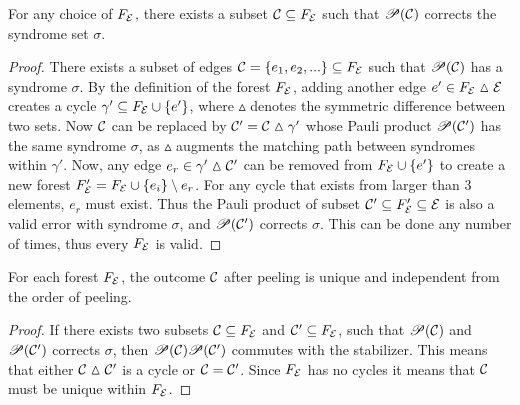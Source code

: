 \begin{lemma}\label{lem:anyforest}
  For any choice of $F_{\mathcal{E}}$, there exists a subset $\mathcal{C}\subseteq F_{\mathcal{E}}$ such that $\mathscr{P}(\mathcal{C})$ corrects the syndrome set $\sigma$.
\end{lemma}
\begin{proof}
  There exists a subset of edges $\mathcal{C} = \{e_1,e_2,...\} \subseteq F_{\mathcal{E}}$ such that $\mathscr{P}(\mathcal{C})$ has a syndrome $\sigma$. By the definition of the forest $F_{\mathcal{E}}$, adding another edge $e' \in F_{\mathcal{E}} \vartriangle \mathcal{E}$ creates a cycle $\gamma' \subseteq F_{\mathcal{E}} \cup \{e'\}$, where $\vartriangle$ denotes the symmetric difference between two sets. Now $\mathcal{C}$ can be replaced by $\mathcal{C}'=\mathcal{C}\vartriangle\gamma'$ whose Pauli product $\mathscr{P}(\mathcal{C}')$ has the same syndrome $\sigma$, as $\vartriangle$ augments the matching path between syndromes within $\gamma'$. Now, any edge $e_r\in \gamma' \vartriangle \mathcal{C}'$ can be removed from $F_{\mathcal{E}} \cup \{e'\}$ to create a new forest $F_{\mathcal{E}}'=F_{\mathcal{E}} \cup \{e_i\}\setminus e_r$. For any cycle that exists from larger than 3 elements, $e_r$ must exist. Thus the Pauli product of subset $\mathcal{C}' \subseteq F_{\mathcal{E}}'\subseteq \mathcal{E}$ is also a valid error with syndrome $\sigma$, and $\mathscr{P}(\mathcal{C}')$ corrects $\sigma$. This can be done any number of times, thus every $F_{\mathcal{E}}$ is valid.
\end{proof}
\begin{lemma}\label{lem:peelingfe}
  For each forest $F_{\mathcal{E}}$, the outcome $\mathcal{C}$ after peeling is unique and independent from the order of peeling.
\end{lemma}
\begin{proof}
  If there exists two subsets $\mathcal{C}\subseteq F_{\mathcal{E}}$ and $\mathcal{C}' \subseteq F_{\mathcal{E}}$, such that $\mathscr{P}(\mathcal{C})$ and $\mathscr{P}(\mathcal{C}')$ corrects $\sigma$, then $\mathscr{P}(\mathcal{C})\mathscr{P}(\mathcal{C}')$ commutes with the stabilizer. This means that either $\mathcal{C}\vartriangle\mathcal{C}'$ is a cycle or $\mathcal{C}=\mathcal{C}'$. Since $F_{\mathcal{E}}$ has no cycles it means that $\mathcal{C}$ must be unique within $F_{\mathcal{E}}$.
\end{proof}

